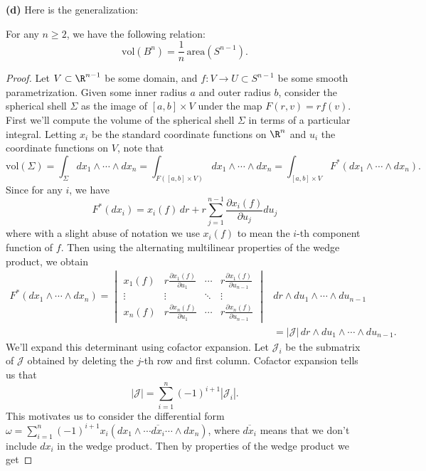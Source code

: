 \documentclass[11pt,letterpaper]{article}
\begin{document}
\begin{solution}
    \textbf{(d)} Here is the generalization:
    \begin{claim}
        For any $n\geq 2$, we have the following relation:
        \[
            \mathrm{vol}(B^n) = \frac{1}{n}\,\mathrm{area}(S^{n-1})
        .\] 
    \end{claim}
    \begin{proof}
        Let $V\subset \R^{n-1}$ be some domain, and $f : V \to U\subset S^{n-1}$ be some smooth parametrization. Given some inner radius $a$ and outer radius $b$, consider the spherical shell $\Sigma$ as the image of $[a,b]\times V$ under the map $F(r,v)=rf(v)$. First we'll compute the volume of the spherical shell $\Sigma$ in terms of a particular integral. Letting $x_i$ be the standard coordinate functions on $\R^n$ and $u_i$ the coordinate functions on $V$, note that
        \[
            \mathrm{vol}(\Sigma)=\int_{\Sigma}dx_1\wedge\cdots\wedge dx_n = \int_{F([a,b]\times V)}dx_1\wedge\cdots\wedge dx_n=\int_{[a,b]\times V}F^*(dx_1\wedge\cdots\wedge dx_n)
        .\] 
        Since for any $i$, we have
        \[
            F^*(dx_i)=x_i(f)\,dr+r\sum^{n-1}_{j=1}\frac{\partial x_i(f)}{\partial u_j}du_j
        \]
        where with a slight abuse of notation we use $x_i(f)$ to mean the $i$-th component function of $f$. Then using the alternating multilinear properties of the wedge product, we obtain
        \[
            \begin{aligned}
                F^*(dx_1\wedge\cdots\wedge dx_n)=\begin{vmatrix} x_1(f)&r\frac{\partial x_1(f)}{\partial u_1}&\cdots&r\frac{\partial x_1(f)}{\partial u_{n-1}}\\ \vdots & \vdots & \ddots & \vdots\\ x_n(f)&r\frac{\partial x_n(f)}{\partial u_1}&\cdots&r\frac{\partial x_n(f)}{\partial u_{n-1}} \end{vmatrix}&dr\wedge du_1\wedge\cdots \wedge du_{n-1}\\
                    &=|\mathcal{J}|\,dr\wedge du_1\wedge\cdots\wedge du_{n-1}.
            \end{aligned}
        \] 
    We'll expand this determinant using cofactor expansion. Let $\mathcal{J}_i$ be the submatrix of $\mathcal{J}$ obtained by deleting the $j$-th row and first column. Cofactor expansion tells us that
    \[
        |\mathcal{J}|=\sum^{n}_{i=1}(-1)^{i+1}|\mathcal{J}_i| 
    .\]  
    This motivates us to consider the differential form $\omega=\sum^n_{i=1}(-1)^{i+1}x_i\left(dx_1\wedge\cdots\overline{dx_i}\cdots\wedge dx_n\right)$, where $\overline{dx_i}$ means that we don't include $dx_i$ in the wedge product. Then by properties of the wedge product we get

\end{proof}
\end{solution}
\end{document}
